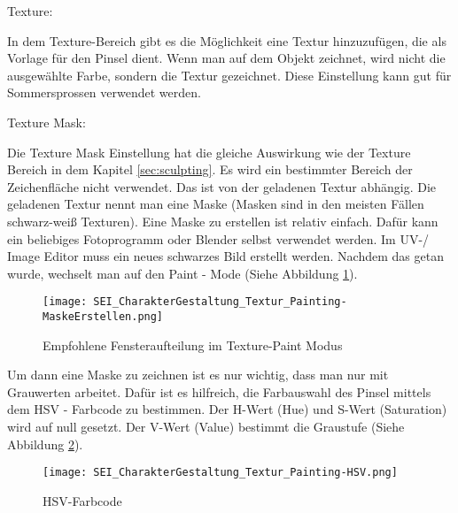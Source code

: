     Texture:

    In dem Texture-Bereich gibt es die Möglichkeit eine Textur hinzuzufügen, die als Vorlage für den Pinsel dient.
    Wenn man auf dem Objekt zeichnet, wird nicht die ausgewählte Farbe, sondern die Textur gezeichnet. Diese
    Einstellung kann gut für Sommersprossen verwendet werden.


    Texture Mask:

    Die Texture Mask Einstellung hat die gleiche Auswirkung wie der Texture Bereich in dem Kapitel \ref{sec:sculpting}.
    Es wird ein bestimmter Bereich der Zeichenfläche nicht verwendet. Das ist von der geladenen Textur abhängig.
    Die geladenen Textur nennt man eine Maske (Masken sind in den meisten Fällen schwarz-weiß Texturen).
    Eine Maske zu erstellen ist relativ einfach. Dafür kann ein beliebiges Fotoprogramm oder Blender selbst verwendet
    werden. Im UV-/ Image Editor muss ein neues schwarzes Bild erstellt werden. Nachdem das getan wurde, wechselt man
    auf den Paint - Mode (Siehe Abbildung \ref{picture:paint_mode}).

    \begin{figure}[H]
        \centering
        \texttt{[image: SEI\_CharakterGestaltung\_Textur\_Painting-MaskeErstellen.png]}
        \caption{Empfohlene Fensteraufteilung im Texture-Paint Modus}
        \label{picture:paint_mode}
    \end{figure}

    Um dann eine Maske zu zeichnen ist es nur wichtig, dass man nur mit Grauwerten arbeitet. Dafür ist es hilfreich,
    die Farbauswahl des Pinsel mittels dem HSV - Farbcode zu bestimmen. Der H-Wert (Hue) und S-Wert (Saturation) wird
    auf null gesetzt. Der V-Wert (Value) bestimmt die Graustufe (Siehe Abbildung \ref{picture:hsv_color_code}).

    \begin{figure}[H]
        \centering
        \texttt{[image: SEI\_CharakterGestaltung\_Textur\_Painting-HSV.png]}
        \caption{HSV-Farbcode}
        \label{picture:hsv_color_code}
    \end{figure}
